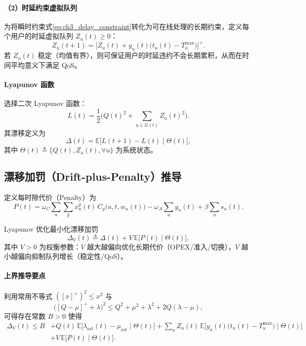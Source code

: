 \documentclass[type=master]{fduthesis}
\begin{document}
\paragraph{（2）时延约束虚拟队列}
为将瞬时约束式\eqref{eq:ch3_delay_constraint}转化为可在线处理的长期约束，定义每个用户的时延虚拟队列 $Z_u(t)\ge 0$：
\begin{equation}
Z_u(t+1)=\Big[Z_u(t)+y_u(t)\big(t_u(t)-T_u^{\max}\big)\Big]^+.
\label{eq:ch3_Z_update}
\end{equation}
若 $Z_u(t)$ 稳定（均值有界），则可保证用户的时延违约不会长期累积，从而在时间平均意义下满足 QoS。

\paragraph{Lyapunov 函数}
选择二次 Lyapunov 函数：
\begin{equation}
L(t)=\frac{1}{2}\Big(Q(t)^2+\sum_{u\in\mathcal{U}(t)} Z_u(t)^2\Big).
\label{eq:ch3_Lyapunov}
\end{equation}
其漂移定义为
\begin{equation}
\Delta(t)=\mathbb{E}\big[L(t+1)-L(t)\mid \Theta(t)\big],
\label{eq:ch3_drift}
\end{equation}
其中 $\Theta(t)\triangleq\{Q(t),Z_u(t),\forall u\}$ 为系统状态。

\subsection{漂移加罚（Drift-plus-Penalty）推导}
\label{subsec:ch3_drift_plus_penalty}

定义每时隙代价（Penalty）为
\begin{equation}
P(t)=
\omega_C \sum_{u}\sum_{g}x_u^g(t)\,C_g\big(u,t,w_u(t)\big)
-\omega_A\sum_{u}y_u(t)
+\beta\sum_{u} s_u(t).
\label{eq:ch3_penalty}
\end{equation}

Lyapunov 优化最小化漂移加罚
\begin{equation}
\Delta_V(t)\triangleq \Delta(t)+V\,\mathbb{E}\big[P(t)\mid \Theta(t)\big],
\label{eq:ch3_dpp}
\end{equation}
其中 $V>0$ 为权衡参数：$V$ 越大越偏向优化长期代价（OPEX/准入/切换），$V$ 越小越偏向抑制队列增长（稳定性/QoS）。

\paragraph{上界推导要点}
利用常用不等式 $( [x]^+ )^2 \le x^2$ 与
\begin{equation}
\big([Q-\mu]^+ + \lambda\big)^2
\le Q^2+\mu^2+\lambda^2+2Q(\lambda-\mu),
\label{eq:ch3_queue_square_ineq}
\end{equation}
可得存在常数 $B>0$ 使得
\begin{align}
\Delta_V(t)
\le
B
&+ Q(t)\,\mathbb{E}\big[\lambda_{\mathrm{sat}}(t)-\mu_{\mathrm{sat}}\mid \Theta(t)\big]
+ \sum_{u} Z_u(t)\,\mathbb{E}\big[y_u(t)\big(t_u(t)-T_u^{\max}\big)\mid \Theta(t)\big]
\nonumber\\
&+ V\,\mathbb{E}\big[P(t)\mid \Theta(t)\big].
\label{eq:ch3_dpp_upper}
\end{align}
\end{document}
